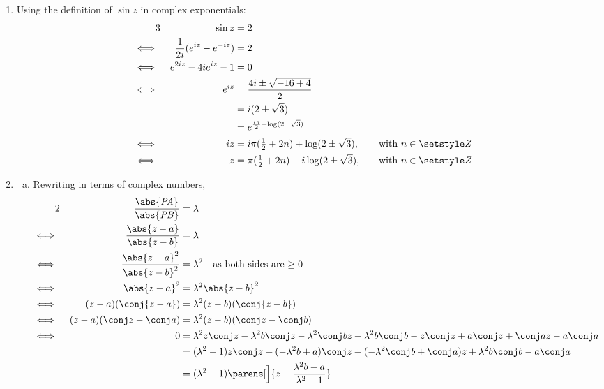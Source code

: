 \documentclass[fleqn,a4paper,11pt]{article}
\begin{document}
\begin{enumerate}
   \item Using the definition of \(\sin z\) in complex exponentials:
    \begin{alignat*}3
     && \sin z &= 2 \\
     \iff{}&& \frac 1{2i}(e^{iz} - e^{-iz}) &= 2 \\
     \iff{}&& e^{2iz} - 4ie^{iz} - 1 &= 0 \\
     \iff{}&& e^{iz} &= \frac{4i \pm \sqrt{-16 + 4}}{2} \\
     &&              &= i(2 \pm \sqrt 3) \\
     &&              &= e^{\frac{i\pi}2 + \log(2 \pm \sqrt 3)} \\
     \iff{}&& iz &= i\pi(\tfrac 12 + 2n) + \log(2 \pm \sqrt 3),
                    \quad &&\text{with \(n \in \Integers\)} \\
     \iff{}&& z &= \pi(\tfrac 12 + 2n) - i\log(2 \pm \sqrt 3),
                    \quad &&\text{with \(n \in \Integers\)}
    \end{alignat*}
   \item
    \begin{enumerate}[(a)]
     \item Rewriting in terms of complex numbers,
      {\setlength{\mathindent}{-2cm}
      \begin{alignat*}2
       && \frac{\abs{\lseg{PA}}}{\abs{\lseg{PB}}} &= \lambda \\
       \iff{}&& \frac{\abs{z - a}}{\abs{z - b}} &= \lambda \\
       \iff{}&& \frac{\abs{z - a}^2}{\abs{z - b}^2} &= \lambda^2 \quad
        \text{as both sides are \(\ge 0\)} \\
       \iff{}&& \abs{z - a}^2 &= \lambda^2\abs{z - b}^2 \\
       \iff{}&& (z - a)(\conj{z - a}) &= \lambda^2(z - b)(\conj{z - b}) \\
       \iff{}&& (z - a)(\conj z - \conj a)
                 &= \lambda^2(z - b)(\conj z - \conj b) \\
       \iff{}&& 0 &= \lambda^2 z\conj z - \lambda^2 b \conj z
                     - \lambda^2 \conj b z
                     + \lambda^2 b \conj b - z \conj z + a \conj z
                     + \conj a z - a \conj a \\
       &&         &= (\lambda^2 - 1)z\conj z + (-\lambda^2 b + a)\conj z
                     + (-\lambda^2\conj b + \conj a)z
                     + \lambda^2 b\conj b - a\conj a \\
       &&         &= (\lambda^2 - 1)
                     \parens[\Big]{z - \frac{\lambda^2 b - a}{\lambda^2 - 1}}

\end{alignat*}}
\end{enumerate}
\end{enumerate}
\end{document}
